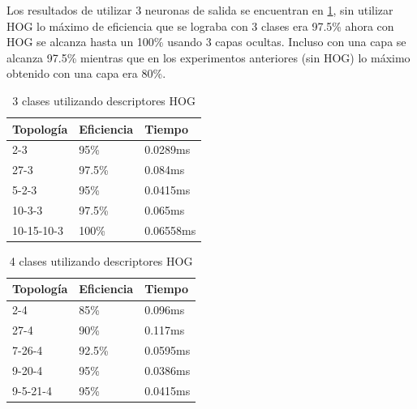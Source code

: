 Los resultados de utilizar 3 neuronas de salida se encuentran en \ref{Hog3Clases}, sin utilizar HOG lo máximo de eficiencia que se lograba con 3 clases era 97.5\% ahora con HOG se alcanza hasta un 100\% usando 3 capas ocultas. Incluso con una capa se alcanza 97.5\% mientras que en los experimentos anteriores (sin HOG) lo máximo obtenido con una capa era 80\%.

\begin{table}[]
	\centering
	\caption{3 clases utilizando descriptores HOG}
	\label{my-label}
	\begin{tabular}{|l|l|l|}
		\hline
		Topología  & Eficiencia & Tiempo    \\ \hline
		2-3        & 95\%       & 0.0289ms  \\ \hline
		27-3       & 97.5\%     & 0.084ms   \\ \hline
		5-2-3      & 95\%       & 0.0415ms  \\ \hline
		10-3-3     & 97.5\%     & 0.065ms   \\ \hline
		10-15-10-3 & 100\%      & 0.06558ms \\ \hline
	\end{tabular}\label{Hog3Clases}
\end{table}



\begin{table}[]
	\centering
	\caption{4 clases utilizando descriptores HOG}
	\label{my-label}
	\begin{tabular}{|l|l|l|}
		\hline
		Topología & Eficiencia & Tiempo   \\ \hline
		2-4       & 85\%       & 0.096ms  \\ \hline
		27-4      & 90\%       & 0.117ms  \\ \hline
		7-26-4    & 92.5\%     & 0.0595ms \\ \hline
		9-20-4    & 95\%       & 0.0386ms \\ \hline
		9-5-21-4  & 95\%       & 0.0415ms \\ \hline
	\end{tabular}\label{Hog4Clases}
\end{table}

